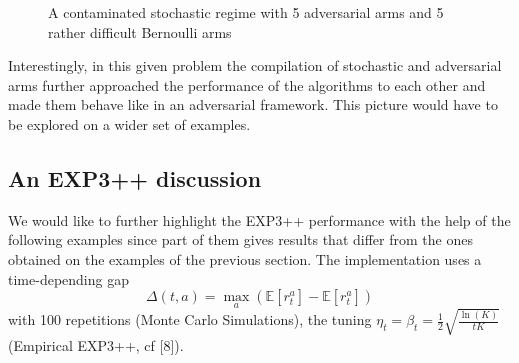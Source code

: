 \documentclass[10.5pt]{article}
\begin{document}
\begin{figure}[H]
  \label{fig:awesome_image3}
\endminipage
\caption{A contaminated stochastic regime with 5 adversarial arms and 5 rather difficult Bernoulli arms}
\end{figure}

Interestingly, in this given problem the compilation of stochastic and adversarial arms further approached the performance of the algorithms to each other and made them behave like in an adversarial framework. This picture would have to be explored on a wider set of examples.

\subsection*{An EXP3++ discussion}
We would like to further highlight the EXP3++ performance with the help of the following examples since part of them gives results that differ from the ones obtained on the examples of the previous section. The implementation uses a time-depending gap $$\Delta(t,a)=\max_{a}(\mathbb{E}[r_{t}^{a}]-\mathbb{E}[r_{t}^{a}])$$ with 100 repetitions (Monte Carlo Simulations), the tuning  $\eta_{t}=\beta_{t}=\frac{1}{2}\sqrt{\frac{\ln(K)}{tK}}$ (Empirical EXP3++, cf [8]).
\end{document}
